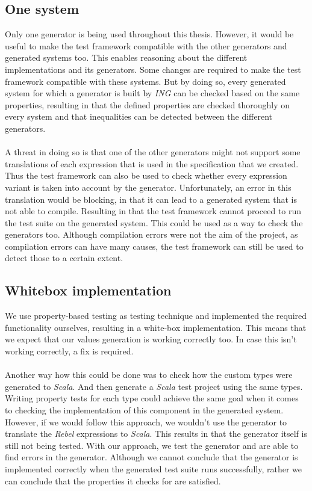 \subsection*{One system}
Only one generator is being used throughout this thesis. However, it would be
useful to make the test framework compatible with the other generators and
generated systems too. This enables reasoning about the different
implementations and its generators. Some changes are required to make the test
framework compatible with these systems. But by doing so, every generated system
for which a generator is built by \textit{ING} can be checked based on the same
properties, resulting in that the defined properties are checked thoroughly on
every system and that inequalities can be detected between the different
generators.\\
\\
A threat in doing so is that one of the other generators might not support some
translations of each expression that is used in the specification that we
created. Thus the test framework can also be used to check whether every
expression variant is taken into account by the generator. Unfortunately, an
error in this translation would be blocking, in that it can lead to a generated
system that is not able to compile. Resulting in that the test framework cannot
proceed to run the test suite on the generated system. This could be used as a
way to check the generators too. Although compilation errors were not the aim of
the project, as compilation errors can have many causes, the test framework can
still be used to detect those to a certain extent.

\subsection*{Whitebox implementation}
We use property-based testing as testing technique and implemented the required
functionality ourselves, resulting in a white-box implementation. This means
that we expect that our values generation is working correctly too. In case this
isn't working correctly, a fix is required.\\
\\
Another way how this could be done was to check how the custom types were
generated to \textit{Scala}. And then generate a \textit{Scala} test project
using the same types. Writing property tests for each type could achieve the
same goal when it comes to checking the implementation of this component in the
generated system. However, if we would follow this approach, we wouldn't use the
generator to translate the \textit{Rebel} expressions to \textit{Scala}. This
results in that the generator itself is still not being tested. With our
approach, we test the generator and are able to find errors in the generator.
Although we cannot conclude that the generator is implemented correctly when the
generated test suite runs successfully, rather we can conclude that the
properties it checks for are satisfied.
